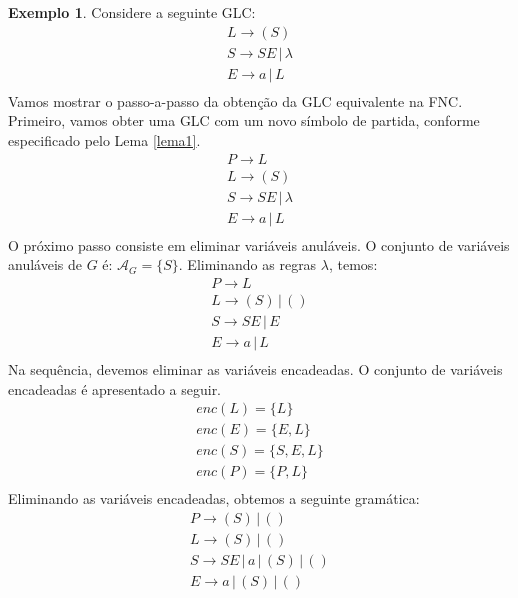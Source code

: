\documentclass[a4paper]{article}
\theoremstyle{definition}
\newtheorem{Example}{Exemplo}
\begin{document}
  \begin{Example}
    Considere a seguinte GLC:
    \[
      \begin{array}{l}
        L \to (S) \\
        S \to SE \,|\, \lambda\\
        E \to a \,|\, L \\
      \end{array}
    \]
    Vamos mostrar o passo-a-passo da obtenção da GLC equivalente na FNC.
    Primeiro, vamos obter uma GLC com um novo símbolo de partida, conforme
    especificado pelo Lema \ref{lema1}.
    \[
      \begin{array}{l}
        P \to L \\
        L \to (S) \\
        S \to SE \,|\, \lambda\\
        E \to a \,|\, L \\
      \end{array}
    \]
    O próximo passo consiste em eliminar variáveis anuláveis. O conjunto de
    variáveis anuláveis de $G$ é: $\mathcal{A}_G =\{S\}$. Eliminando as regras
    $\lambda$, temos:
    \[
      \begin{array}{l}
        P \to L \\
        L \to (S)\,|\,() \\
        S \to SE \,|\, E\\
        E \to a \,|\, L \\
      \end{array}
    \]
    Na sequência, devemos eliminar as variáveis encadeadas. O conjunto de
    variáveis encadeadas é apresentado a seguir.
    \[
      \begin{array}{l}
        enc(L) =\{L\} \\
        enc(E) =\{E,L\}  \\
        enc(S) = \{S, E, L\} \\
        enc(P) = \{P,L\}\\
      \end{array}
    \]
    Eliminando as variáveis encadeadas, obtemos a seguinte gramática:
    \[
      \begin{array}{l}
        P \to (S) \,|\, () \\
        L \to (S)\,|\,() \\
        S \to SE \,|\, a \,|\, (S)\,|\, ()\\
        E \to a \,|\, (S)\,|\,() \\
      \end{array}
\]
\end{Example}
\end{document}
